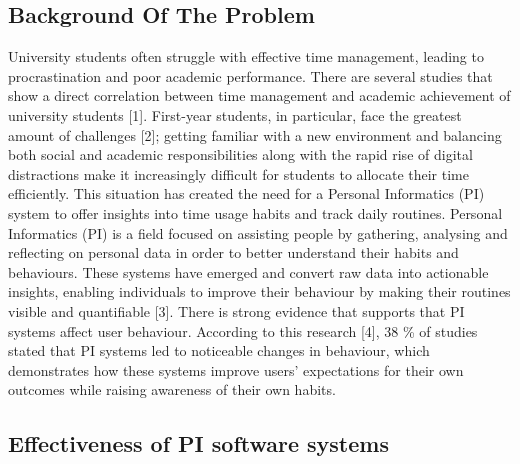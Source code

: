 \documentclass[12pt,a4paper]{article}
\begin{document}
\subsection{Background Of The Problem}
University students often struggle with effective time management, leading to procrastination and poor academic performance. There are several studies that show a direct correlation between time management and academic achievement of university students [1]. First-year students, in particular, face the greatest amount of challenges [2]; getting familiar with a new environment and balancing both social and academic responsibilities along with the rapid rise of digital distractions make it increasingly difficult for students to allocate their time efficiently. This situation has created the need for a Personal Informatics (PI) system to offer insights into time usage habits and track daily routines. Personal Informatics (PI) is a field focused on assisting people by gathering, analysing and reflecting on personal data in order to better understand their habits and behaviours. These systems have emerged and convert raw data into actionable insights, enabling individuals to improve their behaviour by making their routines visible and quantifiable [3]. There is strong evidence that supports that PI systems affect user behaviour. According to this research [4], 38 \% of studies stated that PI systems led to noticeable changes in behaviour, which demonstrates how these systems improve users' expectations for their own outcomes while raising awareness of their own habits.

\subsection{Effectiveness of PI software systems}
\end{document}

